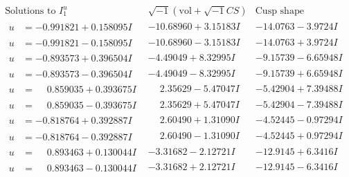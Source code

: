 \documentclass[1p]{elsarticle_modified}
\theoremstyle{definition}
\newcommand{\I}{\sqrt{-1}}
\begin{document}
$$\begin{array}{c|c|c}  
\text{Solutions to }I^u_{1}& \I (\text{vol} + \sqrt{-1}CS) & \text{Cusp shape}\\
 \hline 
\begin{aligned}
u &= -0.991821 + 0.158095 I\end{aligned}
 & -10.68960 + 3.15183 I & -14.0763 - 3.9724 I \\ \hline\begin{aligned}
u &= -0.991821 - 0.158095 I\end{aligned}
 & -10.68960 - 3.15183 I & -14.0763 + 3.9724 I \\ \hline\begin{aligned}
u &= -0.893573 + 0.396504 I\end{aligned}
 & -4.49049 + 8.32995 I & -9.15739 - 6.65948 I \\ \hline\begin{aligned}
u &= -0.893573 - 0.396504 I\end{aligned}
 & -4.49049 - 8.32995 I & -9.15739 + 6.65948 I \\ \hline\begin{aligned}
u &= \phantom{-}0.859035 + 0.393675 I\end{aligned}
 & \phantom{-}2.35629 - 5.47047 I & -5.42904 + 7.39488 I \\ \hline\begin{aligned}
u &= \phantom{-}0.859035 - 0.393675 I\end{aligned}
 & \phantom{-}2.35629 + 5.47047 I & -5.42904 - 7.39488 I \\ \hline\begin{aligned}
u &= -0.818764 + 0.392887 I\end{aligned}
 & \phantom{-}2.60490 + 1.31090 I & -4.52445 - 0.97294 I \\ \hline\begin{aligned}
u &= -0.818764 - 0.392887 I\end{aligned}
 & \phantom{-}2.60490 - 1.31090 I & -4.52445 + 0.97294 I \\ \hline\begin{aligned}
u &= \phantom{-}0.893463 + 0.130044 I\end{aligned}
 & -3.31682 - 2.12721 I & -12.9145 + 6.3416 I \\ \hline\begin{aligned}
u &= \phantom{-}0.893463 - 0.130044 I\end{aligned}
 & -3.31682 + 2.12721 I & -12.9145 - 6.3416 I \\ \hline\begin{aligned}

\end{aligned}
\end{array}$$
\end{document}
